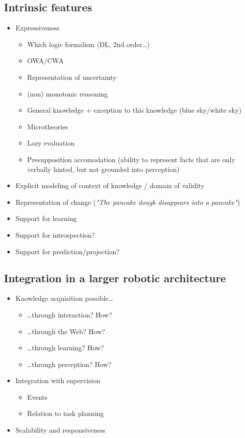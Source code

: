 \documentclass[a4paper]{article}
\begin{document}
\subsection{Intrinsic features}
\label{sect|intrinsic-features}

\begin{itemize}
	\item  Expressiveness
	\begin{itemize}
		\item  Which logic formalism (DL, 2nd order\ldots{})
		\item  OWA/CWA
		\item  Representation of uncertainty
		\item  (non) monotonic reasoning
		\item  General knowledge + exception to this knowledge (blue sky/white sky)
		\item  Microtheories
		\item  Lazy evaluation
		\item  Presupposition accomodation (ability to represent facts that are only verbally hinted, but not grounded into perception)
	\end{itemize}

	\item  Explicit modeling of context of knowledge / domain of validity
	\item  Representation of change (\emph{"The pancake dough disappears into a pancake"})
	\item  Support for learning
	\item  Support for introspection?
	\item  Support for prediction/projection?
\end{itemize}

\subsection{Integration in a larger robotic architecture}

\begin{itemize}
	\item  Knowledge acquisition possible\ldots{}
	\begin{itemize}
		\item  \ldots{}through interaction? How?
		\item  \ldots{}through the Web? How?
		\item  \ldots{}through learning? How?
		\item  \ldots{}through perception? How?
	\end{itemize}

	\item  Integration with supervision
	\begin{itemize}
		\item  Events
		\item  Relation to task planning
	\end{itemize}

	\item  Scalability and responsiveness
\end{itemize}
\end{document}
